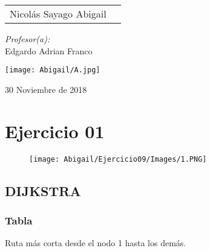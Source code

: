 \documentclass[12pt]{article}
\begin{document}
\begin{titlepage}
\begin{center}
\begin{minipage}{0.5\textwidth}
\begin{flushleft}
                        \begin{tabular}{ll}
                         Nicolás Sayago Abigail\\
                    \end{tabular}
                    \end{flushleft}
                \end{minipage}%
                \begin{minipage}{0.5\textwidth}
                    \begin{flushright} \large
                        \emph{Profesor(a):} \\
                        Edgardo Adrian Franco  \\
                    \end{flushright}
                \end{minipage}
                \vfill
                \begin{minipage}{0.5\textwidth}
                    \begin{center} \large
                        \texttt{[image: Abigail/A.jpg]}
                    \end{center}
                \end{minipage}
                    
                {\large 30 Noviembre de 2018}
            \end{center}
        \end{titlepage}
    \tableofcontents
  \newpage

  
  \section{Ejercicio 01}

    \begin{figure}[h!]
      \centering
      \texttt{[image: Abigail/Ejercicio09/Images/1.PNG]}
    \end{figure} 

    \subsection{DIJKSTRA}

      \subsubsection{Tabla}
        Ruta más corta desde el nodo 1 hasta los demás.
\end{document}
